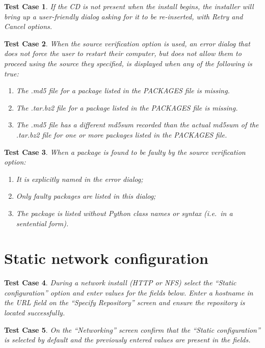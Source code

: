 \documentclass[a4paper]{article}
\newtheorem{testcase}{Test Case}
\begin{document}
\begin{testcase}
If the CD is not present when the install begins, the installer will
bring up a user-friendly dialog asking for it to be re-inserted, with
Retry and Cancel options.
\end{testcase}

\begin{testcase}
When the source verification option is used, an error dialog that does
not force the user to restart their computer, but does not allow them
to proceed using the source they specified, is displayed when any of
the following is true:
\begin{enumerate}
\item The .md5 file for a package listed in the PACKAGES file is
  missing.
\item The .tar.bz2 file for a package listed in the PACKAGES file is
  missing.
\item The .md5 file has a different md5sum recorded than the actual
  md5sum of the .tar.bz2 file for one or more packages listed in the
  PACKAGES file.
\end{enumerate}
\end{testcase}

\begin{testcase}
When a package is found to be faulty by the source verification
option:
\begin{enumerate}
\item It is explicitly named in the error dialog;
\item Only faulty packages are listed in this dialog;
\item The package is listed without Python class names or syntax
(i.e.\ in a sentential form).
\end{enumerate}
\end{testcase}

\section{Static network configuration}

\begin{testcase}
During a network install (HTTP or NFS) select the ``Static
configuration'' option and enter values for the fields below. Enter a
hostname in the URL field on the ``Specify Repository'' screen and
ensure the repository is located successfully.
\end{testcase}

\begin{testcase}
On the ``Networking'' screen confirm that the ``Static configuration'' is
selected by default and the previously entered values are present in
the fields.
\end{testcase}
\end{document}
